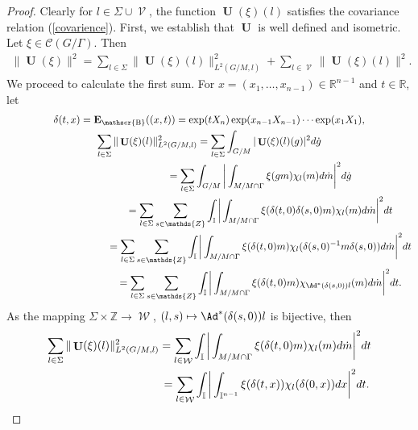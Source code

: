 \documentclass[pdftex]{sigma}
\DeclareMathOperator{\U}{\mathbf{U}}
\DeclareMathOperator{\nongen}{\mathcal{V}}
\DeclareMathOperator{\gen}{\mathcal{W}}
\DeclareMathOperator{\bbase}{\mathscr{B}}
\def\tore{{\mathbb I}}
\begin{document}
\begin{proof} Clearly
for $ l \in \Sigma\cup \nongen$, the function $ \U(\xi)(l)$
satisf\/ies the covariance relation (\ref{covarience}). First, we
establish that $\U$ is well def\/ined and isometric. Let $\xi\in
\mathcal{C}(G/\Gamma)$. Then
\begin{gather*}
  \|\U(\xi)\|^2  = \sum_{l \in \Sigma}\|\U(\xi)(l)\|^2_{L^2(G/M, l)} + \sum_{l\in
  \nongen}
    \|\U(\xi)(l)\|^2.
\end{gather*}
We proceed to calculate the f\/irst sum. For $x=(x_1,\ldots, x_{n-1})
\in \mathds{R}^{n-1}$ and $ t\in \mathds{R}$, let
\begin{gather*}
\delta(t, x) = \mathbf{E}_{\bbase}((x, t))= \exp(t X_n) \exp(x_{n-1} X_{n-1})\cdots \exp(x_1
X_1),
\\
\sum_{l\in \Sigma} \|\U(\xi)(l)\|^2_{L^2(G/M, l)}
   = \sum_{l\in \Sigma} \int_{G/M} | \U(\xi)(l)(g)|^2     d\dot{g }\\
 \hphantom{\sum_{l\in \Sigma} \|\U(\xi)(l)\|^2_{L^2(G/M, l)}} {}
  =  \sum_{l\in \Sigma} \int_{G/M} \bigg| \int_{M/M\cap \Gamma}
\xi(gm) \chi_l(m) d\dot{m}\bigg|^2     d\dot{g}\\
\hphantom{\sum_{l\in \Sigma} \|\U(\xi)(l)\|^2_{L^2(G/M, l)}} {} = \sum_{l\in \Sigma} \sum_{s\in \mathds{Z}} \int_{\tore} \bigg|
\int_{M/M\cap \Gamma} \xi(\delta(t, 0)\delta(s, 0)  m) \chi_l (m)
 d\dot{m} \bigg|^2  dt \\
\hphantom{\sum_{l\in \Sigma} \|\U(\xi)(l)\|^2_{L^2(G/M, l)}} {} =
\sum_{l\in \Sigma} \sum_{s\in \mathds{Z}} \int_{\tore} \bigg|
\int_{M/M\cap \Gamma} \xi(\delta(t, 0)  m) \chi_l ( \delta(s,
0)^{-1} m \delta(s, 0))
 d\dot{m} \bigg|^2  dt\\
\hphantom{\sum_{l\in \Sigma} \|\U(\xi)(l)\|^2_{L^2(G/M, l)}} {}  =  \sum_{l\in \Sigma} \sum_{s\in
\mathds{Z}} \int_{\tore}  \bigg| \int_{M/M\cap \Gamma} \xi(\delta(t, 0)
m) \chi_{\Ad^*(\delta(s, 0))l} (m)
 d\dot{m} \bigg|^2  dt .
\end{gather*}
As the mapping $\Sigma\times \mathds{Z}\rightarrow \gen$, $(l, s) \mapsto \Ad^*(\delta(s, 0))l$
 is bijective, then
 \begin{gather*}
 \sum_{l\in \Sigma} \|\U(\xi)(l)\|^2_{L^2(G/M, l)}
   =  \sum_{l\in \gen}  \int_{\tore}  \bigg| \int_{M/M\cap
\Gamma} \xi(\delta(t, 0) m) \chi_l (m)
 d\dot{m} \bigg|^2  dt  \\
 \hphantom{\sum_{l\in \Sigma} \|\U(\xi)(l)\|^2_{L^2(G/M, l)}}{}
  =  \sum_{l\in \gen}  \int_{\tore}
 \bigg|
 \int_{\tore^{n-1}} \xi(\delta(t, x))
  \chi_l (\delta(0, x))
 dx  \bigg|^2  dt.

\end{gather*}
\end{proof}
\end{document}
